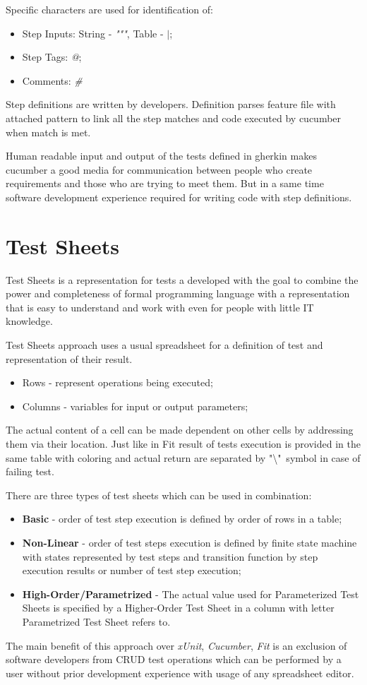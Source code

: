 Specific characters are used for identification of:
\begin{itemize}
	\item Step Inputs: String - \textit{"""}, Table - \textit{$|$};
	\item Step Tags: \textit{@};
	\item Comments: \textit{\#}
\end{itemize}

Step definitions are written by developers. Definition parses feature file with attached pattern to link all the step matches and code executed by cucumber when match is met.

Human readable input and output of the tests defined in gherkin makes cucumber a good media for communication between people who create requirements and those who are trying to meet them. But in a same time software development experience required for writing code with step definitions.

\section{Test Sheets}
\label{sec:testSheets}
Test Sheets is a representation for tests a developed with the goal to combine the power and completeness of formal programming language with a representation that is easy to understand and work with even for people with little IT knowledge\cite{ts}.

Test Sheets approach uses a usual spreadsheet for a definition of test and representation of their result. 
\begin{itemize}
	\item Rows - represent operations being executed;
	\item Columns -  variables for input or output parameters;
\end{itemize}

The actual content of a cell can be made dependent on other cells by addressing them via their location.
Just like in Fit result of tests execution is provided in the same table with coloring and actual return are separated by "\textbackslash"\ symbol in case of failing test\cite{tsb}.

There are three types of test sheets which can be used in combination:
\begin{itemize}
	\item \textbf{Basic} - order of test step execution is defined by order of rows in a table;
	\item \textbf{Non-Linear} - order of test steps execution is defined by finite state machine with states represented by test steps and transition function by step execution results or number of test step execution;
	\item \textbf{High-Order/Parametrized} - The actual value used for Parameterized Test Sheets is specified by a Higher-Order Test Sheet in a column with letter Parametrized Test Sheet refers to.
\end{itemize}
The main benefit of this approach over \textit{xUnit}, \textit{Cucumber}, \textit{Fit} is an exclusion of software developers from CRUD test operations which can be performed by a user without prior development experience with usage of any spreadsheet editor.

